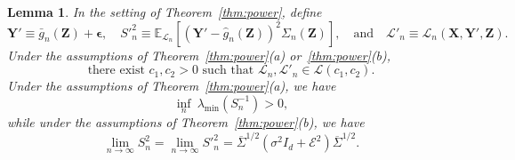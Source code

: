 \documentclass[12pt]{article}
\newtheorem{lemma}{Lemma}
\theoremstyle{definition}
\theoremstyle{remark}
\newcommand{\prx}{\bm X}
\newcommand{\prz}{\bm Z}
\newcommand{\pry}{{\bm Y}}
\newcommand{\peps}{\bm \epsilon}
\begin{document}
\begin{lemma} \label{lem:fourth-moment}
	In the setting of Theorem~\ref{thm:power}, define
	\begin{equation}
		\pry' \equiv \bar g_n(\prz) + \peps, \quad S'^2_{n} \equiv \mathbb E_{\mathcal L_n}[(\pry' - \widehat g_n(\prz))^2 \Sigma_n(\prz)], \quad \text{and} \quad \mathcal L'_n \equiv \mathcal L_n(\prx, \pry', \prz).
		\label{prime-definitions}
	\end{equation}
	Under the assumptions of Theorem~\ref{thm:power}(a) or~\ref{thm:power}(b), 
	\begin{equation}
		\text{there exist } c_1, c_2 > 0 \text{ such that } \mathcal L_n, \mathcal L'_n \in \mathscr L(c_1, c_2).
		\label{eighth-moment}
	\end{equation} 
	Under the assumptions of Theorem~\ref{thm:power}(a), we have
	\begin{equation}
	\inf_{n}\ \lambda_{\min}(S_n^{-1}) > 0,
	\label{eq:s-n-2-limit-a}
	\end{equation}
while under the assumptions of Theorem~\ref{thm:power}(b), we have
	\begin{equation}
		\lim_{n \rightarrow \infty} S_n^2 = \lim_{n \rightarrow \infty}  S'^2_n = \overline \Sigma^{1/2}(\sigma^2 I_d + \mathcal E^2)\overline \Sigma^{1/2}.
		\label{eq:s-n-2-limit}
	\end{equation}
	
\end{lemma}
\end{document}
